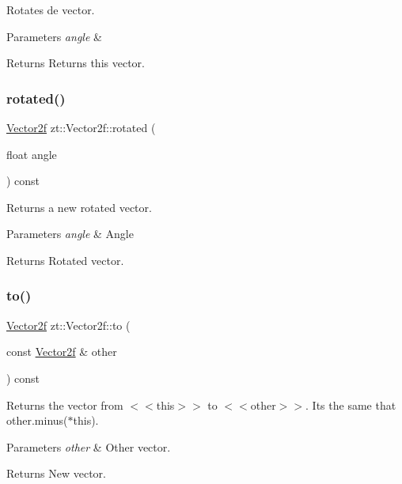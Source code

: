 Rotates de vector. 


\begin{DoxyParams}{Parameters}
{\em angle} & \\
\hline
\end{DoxyParams}
\begin{DoxyReturn}{Returns}
Returns this vector. 
\end{DoxyReturn}
\mbox{\label{classzt_1_1_vector2f_a1b301634478a665f0e0e7cacdc568cac}} 
\subsubsection{\texorpdfstring{rotated()}{rotated()}}
{\footnotesize\ttfamily \hyperlink{classzt_1_1_vector2f}{Vector2f} zt\+::\+Vector2f\+::rotated (\begin{DoxyParamCaption}\item[{float}]{angle }\end{DoxyParamCaption}) const}



Returns a new rotated vector. 


\begin{DoxyParams}{Parameters}
{\em angle} & Angle \\
\hline
\end{DoxyParams}
\begin{DoxyReturn}{Returns}
Rotated vector. 
\end{DoxyReturn}
\mbox{\label{classzt_1_1_vector2f_a2aa1ef32f78d6399891f6318e9a0cd3c}} 
\subsubsection{\texorpdfstring{to()}{to()}}
{\footnotesize\ttfamily \hyperlink{classzt_1_1_vector2f}{Vector2f} zt\+::\+Vector2f\+::to (\begin{DoxyParamCaption}\item[{const \hyperlink{classzt_1_1_vector2f}{Vector2f} \&}]{other }\end{DoxyParamCaption}) const}

Returns the vector from $<$$<$this$>$$>$ to $<$$<$other$>$$>$. Its the same that other.\+minus($\ast$this). 
\begin{DoxyParams}{Parameters}
{\em other} & Other vector. \\
\hline
\end{DoxyParams}
\begin{DoxyReturn}{Returns}
New vector. 
\end{DoxyReturn}
\mbox{\label{classzt_1_1_vector2f_aebb473f59fd05176a89031cad7b5e13a}} 
